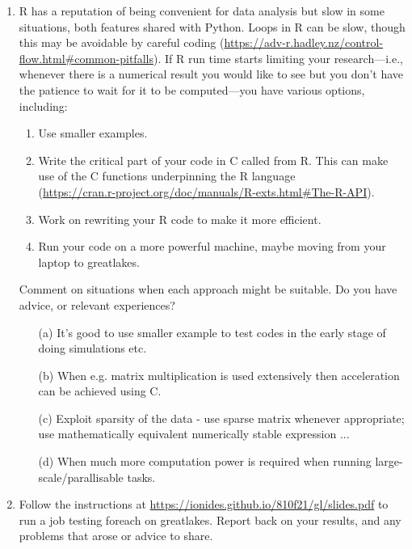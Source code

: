 \documentclass[12pt]{article}
\begin{document}
\begin{enumerate}

\item R has a reputation of being convenient for data analysis but slow in some situations, both features shared with Python. Loops in R can be slow, though this may be avoidable by careful coding (\url{https://adv-r.hadley.nz/control-flow.html#common-pitfalls}). If R run time starts limiting your research---i.e., whenever there is a numerical result you would like to see but you don't have the patience to wait for it to be computed---you have various options, including:
  \begin{enumerate}
  \item Use smaller examples.
  \item Write the critical part of your code in C called from R. This can make use of the C functions underpinning the R language\\
(\url{https://cran.r-project.org/doc/manuals/R-exts.html#The-R-API}).
  \item Work on rewriting your R code to make it more efficient.
  \item Run your code on a more powerful machine, maybe moving from your laptop to greatlakes.
  \end{enumerate}
Comment on situations when each approach might be suitable. Do you have advice, or relevant experiences?
  
\begin{itemize}
\item[(a)] It's good to use smaller example to test codes in the early stage of doing simulations etc.\\
\item[(b)] When e.g. matrix multiplication is used extensively then acceleration can be achieved using C.\\
\item[(c)] Exploit sparsity of the data - use sparse matrix whenever appropriate; use mathematically equivalent numerically stable expression ...\\
\item[(d)] When much more computation power is required when running large-scale/parallisable tasks.

\end{itemize}

\item Follow the instructions at \url{https://ionides.github.io/810f21/gl/slides.pdf} to run a job testing foreach on greatlakes. Report back on your results, and any problems that arose or advice to share.


\end{enumerate}
\end{document}
